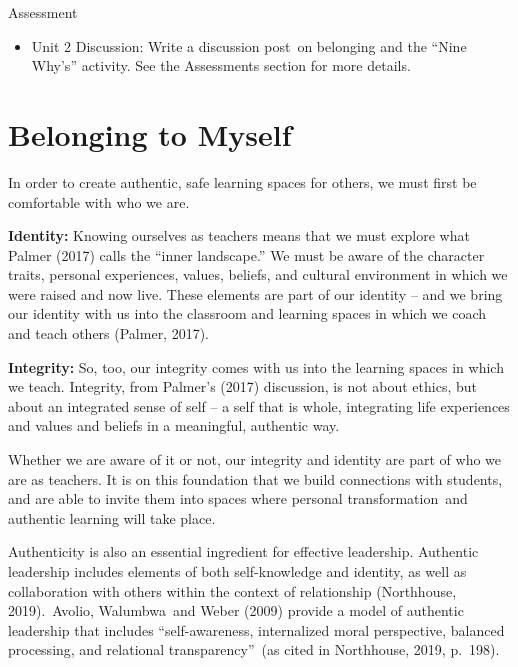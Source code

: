 \documentclass[
]{book}
\providecommand{\tightlist}{%
  \setlength{\itemsep}{0pt}\setlength{\parskip}{0pt}}
\begin{document}
\begin{assessment}
{Assessment}

\begin{itemize}
\tightlist
\item
  Unit 2 Discussion: Write a discussion post~on belonging and the ``Nine
  Why's'' activity. See the Assessments section for more details.
\end{itemize}
\end{assessment}

\hypertarget{belonging-to-myself}{%
\section{Belonging to Myself}\label{belonging-to-myself}}

In order to create authentic, safe learning spaces for others, we must first be comfortable with who we are.

\textbf{Identity:} Knowing ourselves as teachers means that we must explore what Palmer (2017) calls the ``inner landscape.'' We must be aware of the character traits, personal experiences, values, beliefs, and cultural environment in which we were raised and now live. These elements are part of our identity -- and we bring our identity with us into the classroom and learning spaces in which we coach and teach others (Palmer, 2017).

\textbf{Integrity:} So, too, our integrity comes with us into the learning spaces in which we teach. Integrity, from Palmer's (2017) discussion, is not about ethics, but about an integrated sense of self -- a self that is whole, integrating life experiences and values and beliefs in a meaningful, authentic way.

Whether we are aware of it or not, our integrity and identity are part of who we are as teachers. It is on this foundation that we build connections with students, and are able to invite them into spaces where personal transformation~and authentic learning will take place.

Authenticity is also an essential ingredient for effective leadership. Authentic leadership includes elements of both self-knowledge and identity, as well as collaboration with others within the context of relationship (Northhouse, 2019).~Avolio, Walumbwa~and Weber (2009) provide a model of authentic leadership that includes ``self-awareness, internalized moral perspective, balanced processing, and relational transparency''~(as cited in Northhouse, 2019, p.~198).
\end{document}
